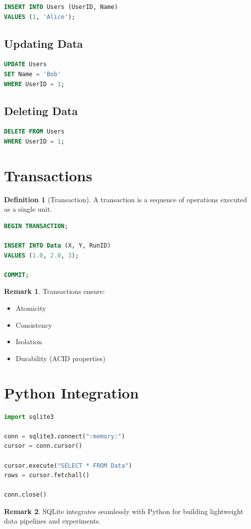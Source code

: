\documentclass[12pt,oneside]{book}
\numberwithin{equation}{section}
\theoremstyle{definition}
\newtheorem{definition}{Definition}[section]
\newtheorem{remark}{Remark}[section]
\theoremstyle{plain}
\theoremstyle{remark}
\begin{document}
\begin{lstlisting}[language=SQL]
INSERT INTO Users (UserID, Name)
VALUES (1, 'Alice');
\end{lstlisting}

\subsection{Updating Data}

\begin{lstlisting}[language=SQL]
UPDATE Users
SET Name = 'Bob'
WHERE UserID = 1;
\end{lstlisting}

\subsection{Deleting Data}

\begin{lstlisting}[language=SQL]
DELETE FROM Users
WHERE UserID = 1;
\end{lstlisting}

\section{Transactions}

\begin{definition}[Transaction]
A transaction is a sequence of operations executed as a single unit.
\end{definition}

\begin{lstlisting}[language=SQL]
BEGIN TRANSACTION;

INSERT INTO Data (X, Y, RunID)
VALUES (1.0, 2.0, 3);

COMMIT;
\end{lstlisting}

\begin{remark}
Transactions ensure:
\begin{itemize}
    \item Atomicity
    \item Consistency
    \item Isolation
    \item Durability (ACID properties)
\end{itemize}
\end{remark}

\section{Python Integration}

\begin{lstlisting}[language=Python]
import sqlite3

conn = sqlite3.connect(":memory:")
cursor = conn.cursor()

cursor.execute("SELECT * FROM Data")
rows = cursor.fetchall()

conn.close()
\end{lstlisting}

\begin{remark}
SQLite integrates seamlessly with Python for building lightweight data pipelines and experiments.
\end{remark}
\end{document}
